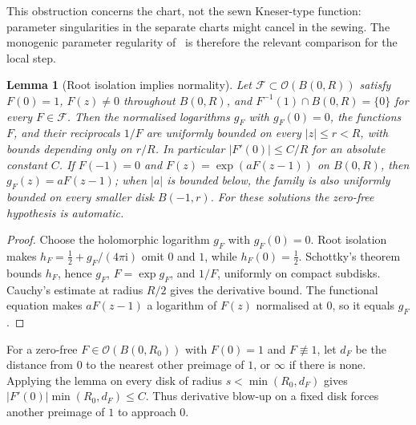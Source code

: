 \documentclass[11pt,a4paper]{article}
\newtheorem{lemma}[theorem]{Lemma}
\theoremstyle{definition}
\newcommand{\ii}{\mathrm{i}}
\begin{document}
This obstruction concerns the chart, not the sewn Kneser-type function:
parameter singularities in the separate charts might cancel in the sewing.
The monogenic parameter regularity of~\cite{MarmiCarminati2008} is therefore
the relevant comparison for the local step.

\begin{lemma}[Root isolation implies normality]\label{lem:root-normal}
Let $\mathcal F\subset\mathcal O(B(0,R))$ satisfy $F(0)=1$, $F(z)\ne0$
throughout $B(0,R)$, and
$F^{-1}(1)\cap B(0,R)=\{0\}$ for every $F\in\mathcal F$.
Then the normalised logarithms $g_F$ with $g_F(0)=0$, the functions $F$,
and their reciprocals $1/F$ are uniformly
bounded on every $|z|\le r<R$, with bounds depending only on $r/R$.
In particular $|F'(0)|\le C/R$ for an absolute constant $C$.
If $F(-1)=0$ and $F(z)=\exp(aF(z-1))$ on $B(0,R)$, then
$g_F(z)=aF(z-1)$; when $|a|$ is bounded below, the family is also
uniformly bounded on every smaller disk $B(-1,r)$.  For these
solutions the zero-free hypothesis is automatic.
\end{lemma}

\begin{proof}
Choose the holomorphic logarithm $g_F$ with $g_F(0)=0$.  Root isolation
makes $h_F=\tfrac12+g_F/(4\pi\ii)$ omit $0$ and $1$, while
$h_F(0)=\tfrac12$.  Schottky's theorem bounds $h_F$, hence $g_F$,
$F=\exp g_F$, and $1/F$, uniformly on compact subdisks.  Cauchy's
estimate at radius $R/2$ gives the derivative bound.  The functional
equation makes $aF(z-1)$ a logarithm of $F(z)$ normalised at $0$,
so it equals $g_F$.
\end{proof}

For a zero-free $F\in\mathcal O(B(0,R_0))$ with $F(0)=1$ and
$F\not\equiv1$, let $d_F$ be the distance from $0$ to the nearest
other preimage of $1$, or $\infty$ if there is none.  Applying the lemma
on every disk of radius $s<\min(R_0,d_F)$ gives
$|F'(0)|\min(R_0,d_F)\le C$.  Thus derivative blow-up on a fixed disk
forces another preimage of $1$ to approach $0$.
\end{document}
